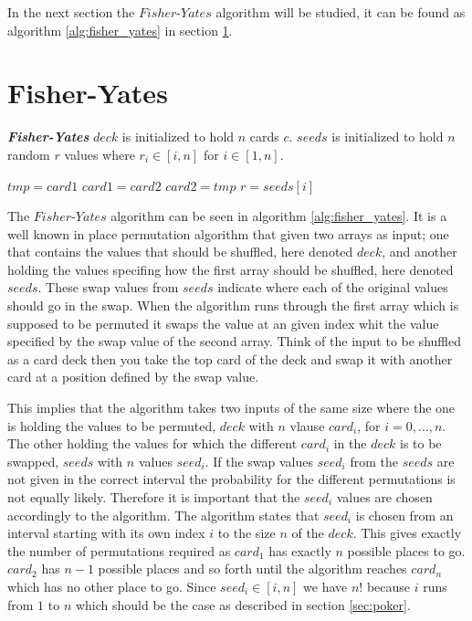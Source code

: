 \documentclass[twoside,11pt,openright]{report}
\begin{document}
\bigskip

In the next section the $Fisher\text{-}Yates$ algorithm will be studied, it can be found as algorithm \ref{alg:fisher_yates} in section \ref{sec:fisher-yates}.

\section{Fisher-Yates}
\label{sec:fisher-yates}

\begin{algorithm}
\caption{\textbf{\textit{Fisher-Yates}} \newline
    $deck$ is initialized to hold $n$ cards $c$. \newline
    $seeds$ is initialized to hold $n$ random $r$ values where $r_i\in[i,n]$ for $i\in [1,n]$.
}
\label{alg:fisher_yates}

\begin{algorithmic}[1]
\State $tmp = card1$
\State $card1 = card2$
\State $card2 = tmp$
\EndFunction
\State
{}
\State $r = seeds[i]$
\State {}
\EndFor
\EndFunction
\end{algorithmic}
\end{algorithm}

The $Fisher\text{-}Yates$ algorithm can be seen in algorithm \ref{alg:fisher_yates}. It is a well known in place permutation algorithm that given two arrays as input; one that contains the values that should be shuffled, here denoted $deck$, and another holding the values specifing how the first array should be shuffled, here denoted $seeds$. These swap values from $seeds$ indicate where each of the original values should go in the swap. When the algorithm runs through the first array which is supposed to be permuted it swaps the value at an given index whit the value specified by the swap value of the second array. Think of the input to be shuffled as a card deck then you take the top card of the deck and swap it with another card at a position defined by the swap value.

This implies that the algorithm takes two inputs of the same size where the one is holding the values to be permuted, $deck$ with $n$ vlause $card_i$, for $i=0,\dots,n$. The other holding the values for which the different $card_i$ in the $deck$ is to be swapped, $seeds$ with $n$ values $seed_i$. If the swap values $seed_i$ from the $seeds$ are not given in the correct interval the probability for the different permutations is not equally likely. Therefore it is important that the $seed_i$ values are chosen accordingly to the algorithm. The algorithm states that $seed_i$ is chosen from an interval starting with its own index $i$ to the size $n$ of the $deck$. This gives exactly the number of permutations required as $card_1$ has exactly $n$ possible places to go. $card_2$ has $n-1$ possible places and so forth until the algorithm reaches $card_n$ which has no other place to go. Since $seed_i\in[i,n]$ we have $n!$ because $i$ runs from $1$ to $n$ which should be the case as described in section \ref{sec:poker}.
\end{document}
